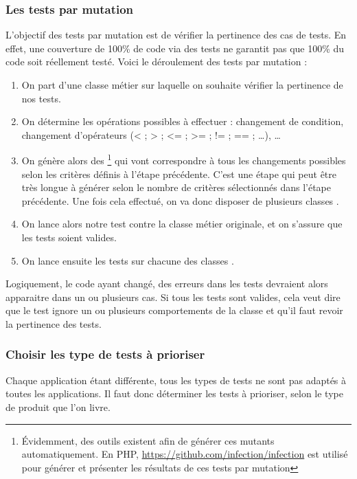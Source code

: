 \subsubsection{Les tests par mutation}\label{ref-mutation}

L'objectif des tests par mutation est de vérifier la pertinence des cas de tests. En effet, une couverture de 100\% de code via des tests ne garantit pas que 100\% du code soit réellement testé. Voici le déroulement des tests par mutation : 

\begin{enumerate}
	\setlength\itemsep{0em}
	\item On part d'une classe métier sur laquelle on souhaite vérifier la pertinence de nos tests.
	\item On détermine les opérations possibles à effectuer : changement de condition, changement d'opérateurs (< ; > ; <= ; >= ; != ; == ; \ldots), \ldots
	\item On génère alors des \footnote{Évidemment, des outils existent afin de générer ces mutants automatiquement. En \gls{PHP}, \url{https://github.com/infection/infection} est utilisé pour générer et présenter les résultats de ces tests par mutation} qui vont correspondre à tous les changements possibles selon les critères définis à l'étape précédente. C'est une étape qui peut être très longue à générer selon le nombre de critères sélectionnés dans l'étape précédente. Une fois cela effectué, on va donc disposer de plusieurs classes .
	\item On lance alors notre test contre la classe métier originale, et on s'assure que les tests soient valides.
	\item On lance ensuite les tests sur chacune des classes .
\end{enumerate}

Logiquement, le code ayant changé, des erreurs dans les tests devraient alors apparaitre dans un ou plusieurs cas. Si tous les tests sont valides, cela veut dire que le test ignore un ou plusieurs comportements de la classe et qu'il faut revoir la pertinence des tests.

\subsubsection{Choisir les type de tests à prioriser}

Chaque application étant différente, tous les types de tests ne sont pas adaptés à toutes les applications. Il faut donc déterminer les tests à prioriser, selon le type de produit que l'on livre.

